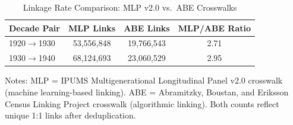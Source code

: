 
\begin{table}[H]
\centering
\caption{Linkage Rate Comparison: MLP v2.0 vs.\ ABE Crosswalks}
\begin{threeparttable}
\begin{tabular}{lccc}
\toprule
Decade Pair & MLP Links & ABE Links & MLP/ABE Ratio \\
\midrule
1920$\rightarrow$1930 & 53,556,848 & 19,766,543 & 2.71 \\
1930$\rightarrow$1940 & 68,124,693 & 23,060,529 & 2.95 \\
\bottomrule
\end{tabular}
\begin{tablenotes}[flushleft]
\small
\item Notes: MLP = IPUMS Multigenerational Longitudinal Panel v2.0 crosswalk (machine learning-based linking). ABE = Abramitzky, Boustan, and Eriksson Census Linking Project crosswalk (algorithmic linking). Both counts reflect unique 1:1 links after deduplication.
\end{tablenotes}
\end{threeparttable}
\label{tab:abe_comparison}
\end{table}

